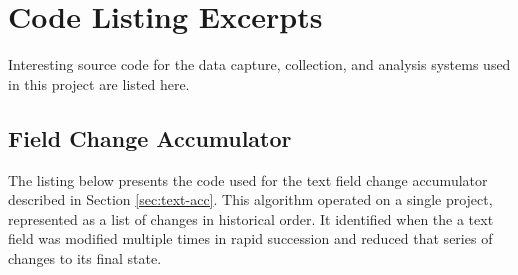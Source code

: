 \chapter{Code Listing Excerpts} 
\label{appendix:listings}

Interesting source code for the data capture, collection, and analysis systems used in this project are listed here. 


\section{Field Change Accumulator}
\label{src:reduceFieldChanges}

The listing below %
presents the code used for the text field change accumulator described in Section \ref{sec:text-acc}. This algorithm operated on a single project, represented as a list of changes in historical order. It identified when the a text field was modified multiple times in rapid succession and reduced that series of changes to its final state.

